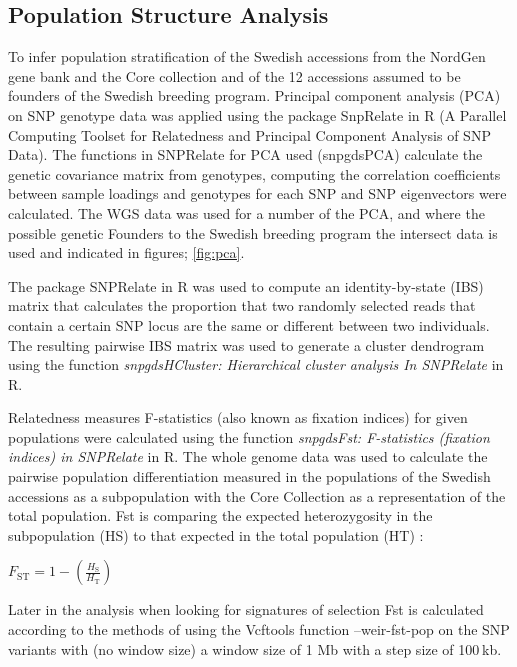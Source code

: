 \documentclass[9pt, onecolumn,twoside]{gsajnl}
\begin{document}
\subsection{Population Structure Analysis}
To infer population stratification of the Swedish accessions from the NordGen gene bank and the Core collection and of the 12 accessions assumed to be founders of the Swedish breeding program. Principal component analysis (PCA) on SNP genotype data was applied using the package SnpRelate in R (A Parallel Computing Toolset for Relatedness and Principal Component Analysis of SNP Data). The functions in SNPRelate for PCA used (snpgdsPCA) calculate the genetic covariance matrix from genotypes, computing the correlation coefficients between sample loadings and genotypes for each SNP and SNP eigenvectors were calculated. The WGS data was used for a number of the PCA, and where the possible genetic Founders to the Swedish breeding program the intersect data is used and indicated in figures; \ref{fig:pca}.

The package SNPRelate in R was used to compute an identity-by-state (IBS) matrix that calculates the proportion that two randomly selected reads that contain a certain SNP locus are the same or different between two individuals. The resulting pairwise IBS matrix was used to generate a cluster dendrogram using the function \textit{snpgdsHCluster: Hierarchical cluster analysis In SNPRelate }in R. 

Relatedness measures F-statistics (also known as fixation indices) for given populations were calculated using the function \textit{snpgdsFst: F-statistics (fixation indices) in SNPRelate }in R. The whole genome data was used to calculate the pairwise population differentiation measured in the populations of the Swedish accessions as a subpopulation with the Core Collection as a representation of the total population. Fst is comparing the expected heterozygosity in the subpopulation (HS) to that expected in the total population (HT) :

$F_{\text{ST}} = 1 - \left(\frac{H_{\text{S}}}{H_{\text{T}}}\right)$

Later in the analysis when looking for signatures of selection Fst is calculated according to the methods of \cite{Weir84} using the Vcftools \cite{danecek11} function --weir-fst-pop on the SNP variants with (no window size) a window size of 1 Mb with a step size of 100 kb.
\end{document}
